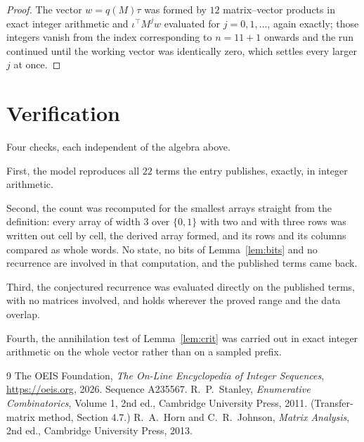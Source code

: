 \documentclass[11pt,a4paper]{article}
\theoremstyle{plain}
\theoremstyle{definition}
\begin{document}
\begin{proof}
The vector $w=q(M)\tau$ was formed by $12$ matrix--vector products in exact integer
arithmetic and $\iota^{\!\top}M^{j}w$ evaluated for $j=0,1,\dots$, again exactly; those
integers vanish from the index corresponding to $n=11+1$ onwards and the run continued
until the working vector was identically zero, which settles every larger $j$ at once.
\end{proof}

\section{Verification}

Four checks, each independent of the algebra above.

First, the model reproduces all $22$ terms the entry publishes, exactly, in integer
arithmetic.

Second, the count was recomputed for the smallest arrays straight from the definition: every
array of width $3$ over $\{0,1\}$ with two and with three rows was written out cell by cell,
the derived array formed, and its rows and its columns compared as whole words. No state, no
bits of Lemma~\ref{lem:bits} and no recurrence are involved in that computation, and the
published terms came back.

Third, the conjectured recurrence was evaluated directly on the published terms, with no
matrices involved, and holds wherever the proved range and the data overlap.

Fourth, the annihilation test of Lemma~\ref{lem:crit} was carried out in exact integer
arithmetic on the whole vector rather than on a sampled prefix.

\begin{thebibliography}{9}
 The OEIS Foundation, \emph{The On-Line Encyclopedia of Integer
Sequences}, \url{https://oeis.org}, 2026. Sequence A235567.
 R.~P.~Stanley, \emph{Enumerative Combinatorics}, Volume 1, 2nd ed.,
Cambridge University Press, 2011. (Transfer-matrix method, Section 4.7.)
 R.~A.~Horn and C.~R.~Johnson, \emph{Matrix Analysis}, 2nd ed., Cambridge
University Press, 2013.
\end{thebibliography}
\end{document}
